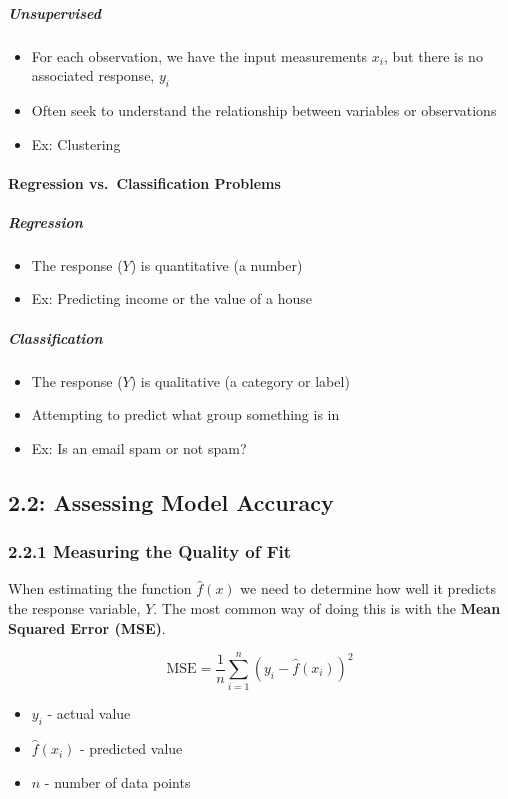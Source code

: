   \subparagraph{Unsupervised}
   \begin{itemize}
       \tightlist
\item  For each observation, we have the input measurements \(x_i\), but  there is no associated response, \(y_i\)
\item  Often seek to understand the relationship between variables or  observations
\item  Ex: Clustering
\end{itemize}

\paragraph{Regression vs.~Classification Problems}\label{regression-vs.-classification-problems}

\subparagraph{Regression}\label{regression}

\begin{itemize}
\tightlist
\item  The response (\(Y\)) is quantitative (a number)
\item  Ex: Predicting income or the value of a house 
\end{itemize}
\subparagraph{Classification}
\begin{itemize}
\tightlist
\item  The response (\(Y\)) is qualitative (a category or label)
\item  Attempting to predict what group something is in
\item  Ex: Is an email spam or not spam?
\end{itemize}

\subsection*{2.2: Assessing Model Accuracy}\label{assessing-model-accuracy}

\subsubsection*{2.2.1 Measuring the Quality of Fit}\label{measuring-the-quality-of-fit}

When estimating the function \(\hat f (x)\) we need to determine how well it predicts the response variable, \(Y\).
The most common way of doing this is with the \textbf{Mean Squared Error (MSE)}.

\begin{equation*}
    \text{MSE} = \frac{1}{n}\sum_{i=1}^{n}\left(y_i - \hat f(x_i) \right)^2
\end{equation*}
\begin{itemize}
    \tightlist
    \item \(y_i\) - actual value
    \item  \(\hat{f}(x_i)\) - predicted value
    \item \(n\) - number of data points
\end{itemize}

